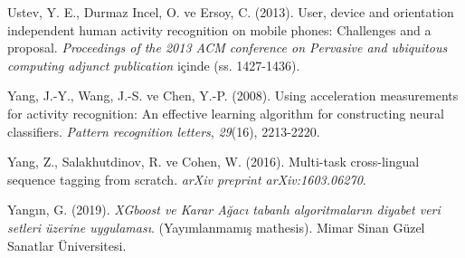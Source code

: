 \documentclass[12pt,twoside]{deuthesis}
\begin{document}
\begin{CSLReferences}{1}{0}
\leavevmode{}%
Ustev, Y. E., Durmaz Incel, O. ve Ersoy, C. (2013). User, device and orientation independent human activity recognition on mobile phones: Challenges and a proposal. \emph{Proceedings of the 2013 ACM conference on Pervasive and ubiquitous computing adjunct publication} içinde (ss. 1427-1436).

\leavevmode{}%
Yang, J.-Y., Wang, J.-S. ve Chen, Y.-P. (2008). Using acceleration measurements for activity recognition: An effective learning algorithm for constructing neural classifiers. \emph{Pattern recognition letters}, \emph{29}(16), 2213-2220.

\leavevmode{}%
Yang, Z., Salakhutdinov, R. ve Cohen, W. (2016). Multi-task cross-lingual sequence tagging from scratch. \emph{arXiv preprint arXiv:1603.06270}.

\leavevmode{}%
Yangın, G. (2019). \emph{XGboost ve Karar A{ğ}ac{ı} tabanl{ı} algoritmalar{ı}n diyabet veri setleri {ü}zerine uygulamas{ı}}. (Yayımlanmamış mathesis). Mimar Sinan G{ü}zel Sanatlar {Ü}niversitesi.

\end{CSLReferences}
\setlength{\parindent}{-0.20in}
\setlength{\leftskip}{0.20in}
\setlength{\parskip}{8pt}
\end{document}
